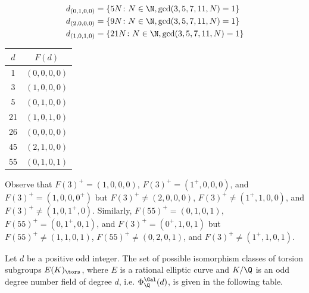 \begin{frame}[plain]
\footnotesize
\begin{ex}
	\[
	\begin{aligned}
	d_{(0,1,0,0)}&= \{ 5N \colon N \in \N, \gcd(3,5,7,11,N)= 1 \} \\
	d_{(2,0,0,0)}&=  \{ 9N \colon N \in \N, \gcd(3,5,7,11,N)= 1 \} \\
	d_{(1,0,1,0)}&=  \{ 21N \colon N \in \N, \gcd(3,5,7,11,N)= 1 \}
	\end{aligned}
	\]
	\begin{table}[!ht]
	\centering
	\begin{tabular}{cc} \hline
	$d$ & $F(d)$ \\ \hline 
	1 & $(0,0,0,0)$ \\
	3 & $(1,0,0,0)$ \\
	5 & $(0,1,0,0)$ \\
	21 & $(1,0,1,0)$ \\
	26 & $(0,0,0,0)$ \\
	45 & $(2,1,0,0)$ \\
	55 & $(0,1,0,1)$
	\end{tabular}
	\end{table}
Observe that $F(3)^+= (1,0,0,0)$, $F(3)^+= (1^+,0,0,0)$, and $F(3)^+= (1,0,0,0^+)$ but $F(3)^+ \neq (2,0,0,0)$, $F(3)^+ \neq (1^+,1,0,0)$, and $F(3)^+ \neq (1,0,1^+,0)$. Similarly, $F(55)^+= (0,1,0,1)$, $F(55)^+= (0,1^+,0,1)$, and $F(3)^+= (0^+,1,0,1)$ but $F(55)^+ \neq (1,1,0,1)$, $F(55)^+ \neq (0,2,0,1)$, and $F(3)^+ \neq (1^+,1,0,1)$.
\end{ex}
\end{frame}





\begin{frame}[plain]
\begin{thm}
Let $d$ be a positive odd integer. The set of possible isomorphism classes of torsion subgroups $E(K)_\tors$, where $E$ is a rational elliptic curve and $K/\Q$ is an odd degree number field of degree $d$, i.e. $\Phi_\Q^{\Gal}(d)$, is given in the following table.
 \end{thm} 
\end{frame}





